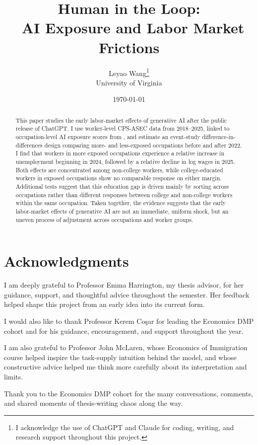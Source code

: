 \documentclass[11pt]{article}
\title{Human in the Loop:  \\\
AI Exposure and Labor Market Frictions}
\author{Leyao Wang\thanks{I acknowledge the use of ChatGPT and Claude for coding, writing, and research support throughout this project.}\\
        \small University of Virginia}
\date{\today}
\theoremstyle{plain}
\theoremstyle{remark}
\begin{document}
\maketitle

\begin{abstract}
\noindent
This paper studies the early labor-market effects of generative AI after the public release of ChatGPT. I use worker-level CPS-ASEC data from 2018–2025, linked to occupation-level AI exposure scores from \textcite{eloundou2024gpts}, and estimate an event-study difference-in-differences design comparing more- and less-exposed occupations before and after 2022. I find that workers in more exposed occupations experience a relative increase in unemployment beginning in 2024, followed by a relative decline in log wages in 2025. Both effects are concentrated among non-college workers, while college-educated workers in exposed occupations show no comparable response on either margin. Additional tests suggest that this education gap is driven mainly by sorting across occupations rather than different responses between college and non-college workers within the same occupation. Taken together, the evidence suggests that the early labor-market effects of generative AI are not an immediate, uniform shock, but an uneven process of adjustment across occupations and worker groups.
\end{abstract}

\clearpage
\section*{Acknowledgments}

I am deeply grateful to Professor Emma Harrington, my thesis advisor, for her guidance, support, and thoughtful advice throughout the semester. Her feedback helped shape this project from an early idea into its current form.

I would also like to thank Professor Kerem Co\c{s}ar for leading the Economics DMP cohort and for his guidance, encouragement, and support throughout the year.

I am also grateful to Professor John McLaren, whose Economics of Immigration course helped inspire the task-supply intuition behind the model, and whose constructive advice helped me think more carefully about its interpretation and limits.

Thank you to the Economics DMP cohort for the many conversations, comments, and shared moments of thesis-writing chaos along the way.
\end{document}
